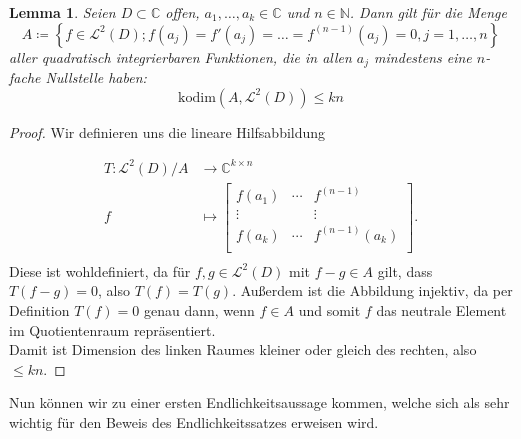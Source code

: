 \documentclass[11pt,a4paper,toc=bibliography]{scrartcl}
\theoremstyle{thm}
\newtheorem{lemma}{Lemma}[section]
\theoremstyle{def}
\theoremstyle{remark}
\begin{document}
\begin{lemma}
Seien $D\subset\mathbb{C}$ offen, $a_1,\ldots,a_k\in\mathbb{C}$ und $n\in\mathbb{N}$. Dann gilt für die Menge \[A\coloneqq \left\{ f\in \mathcal{L}^2(D); f(a_j)=f'(a_j)=\ldots=f^{(n-1)}(a_j)= 0,  j=1,\ldots,n\right\}\]
aller quadratisch integrierbaren Funktionen, die in allen $a_j$ mindestens eine $n$- fache Nullstelle haben:
\[ \mathrm{kodim}(A,\mathcal{L}^2(D))\leq kn 
\]
\end{lemma}
\begin{proof}
Wir definieren uns die lineare Hilfsabbildung

\begin{align*}
T:\mathcal{L}^2(D)/A 	&\longrightarrow 	\mathbb{C}^{k\times n}\\
  f 					&\longmapsto 			     \begin{bmatrix}
  													f(a_1) &\cdots & f^{(n-1)}\\
  													\vdots & &\vdots\\
  													f(a_k) &\cdots & f^{(n-1)}(a_k)\\
													\end{bmatrix}. \\
\end{align*} 
Diese ist wohldefiniert, da für $f,g\in \mathcal{L}^2(D)$ mit $f-g\in A$ gilt, dass $T(f-g)=0$, also $T(f)=T(g)$. Außerdem ist die Abbildung injektiv, da per Definition $T(f)=0$ genau dann, wenn $f\in A$ und somit $f$ das neutrale Element im Quotientenraum repräsentiert.
\\ Damit ist Dimension des linken Raumes kleiner oder gleich des rechten, also $\leq kn$.
\end{proof}

Nun können wir zu einer ersten Endlichkeitsaussage kommen, welche sich als sehr wichtig für den Beweis des Endlichkeitssatzes erweisen wird.
\end{document}
